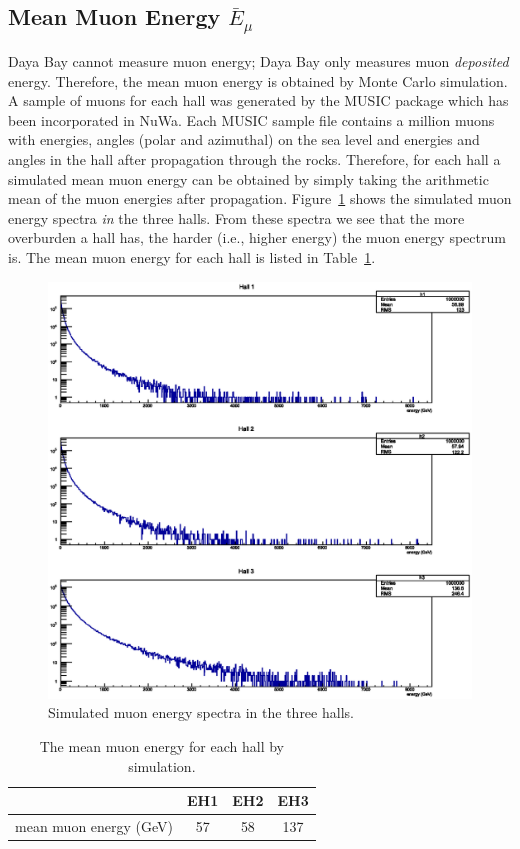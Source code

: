 \subsection{Mean Muon Energy \texorpdfstring{$\bar{E}_\mu$}{E}}
Daya Bay cannot measure muon energy; Daya Bay only measures muon \emph{deposited} energy. Therefore, the mean muon energy is obtained by Monte Carlo simulation. A sample of muons for each hall was generated by the MUSIC package which has been incorporated in NuWa. Each MUSIC sample file contains a million muons with energies, angles (polar and azimuthal) on the sea level and energies and angles in the hall after propagation through the rocks. Therefore, for each hall a simulated mean muon energy can be obtained by simply taking the arithmetic mean of the muon energies after propagation. Figure~\ref{fig:muon_energy_spectrum} shows the simulated muon energy spectra \emph{in} the three halls. From these spectra we see that the more overburden a hall has, the harder (i.e., higher energy) the muon energy spectrum is. The mean muon energy for each hall is listed in Table~\ref{table:mean_muon_energy}.
\begin{figure}
	\centering
	\includegraphics[width=\textwidth]{figures/chap7/muon_energy_spectrum.eps}
	\caption{Simulated muon energy spectra in the three halls.}
	\label{fig:muon_energy_spectrum}
\end{figure}
\begin{table}
	\centering
	\begin{tabular}{cccc}
	\toprule
	& EH1 & EH2 & EH3 \\
	\midrule
	mean muon energy (GeV) & 57 & 58 & 137 \\
	\bottomrule
	\end{tabular}
	\caption{The mean muon energy for each hall by simulation.}
	\label{table:mean_muon_energy}
\end{table}


